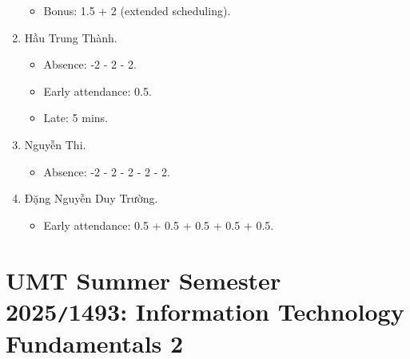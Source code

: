 \documentclass{article}
\begin{document}
\begin{enumerate}
\begin{itemize}
		\item Bonus: 1.5 + 2 (extended scheduling).
	\end{itemize}
	\item {\sc Hầu Trung Thành.}
	\begin{itemize}
		\item Absence: -2 - 2 - 2.
		\item Early attendance: 0.5.
		\item Late: 5 mins.
	\end{itemize}
	\item {\sc Nguyễn Thi.}
	\begin{itemize}
		\item Absence: -2 - 2 - 2 - 2 - 2.
	\end{itemize}
	\item {\sc Đặng Nguyễn Duy Trường.}
	\begin{itemize}
		\item Early attendance: 0.5 + 0.5 + 0.5 + 0.5 + 0.5.
	\end{itemize}
\end{enumerate}


\section{UMT Summer Semester 2025{\tt/}1493: Information Technology Fundamentals 2}
\end{document}
